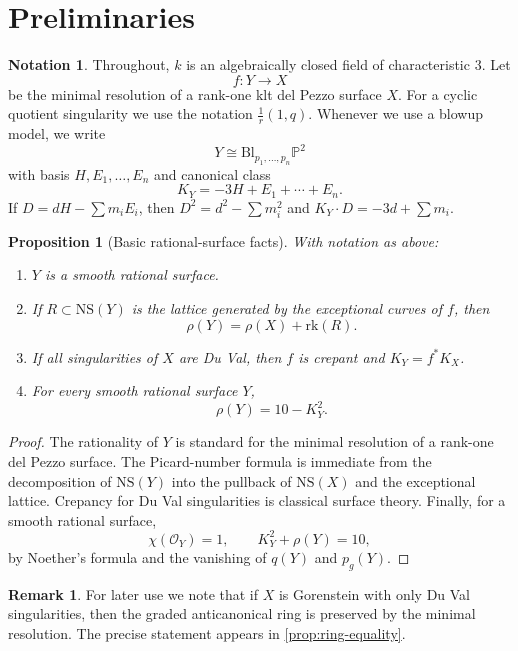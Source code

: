 \documentclass[11pt]{article}
\newtheorem{proposition}[theorem]{Proposition}
\theoremstyle{definition}
\newtheorem{remark}[theorem]{Remark}
\newtheorem{notation}[theorem]{Notation}
\newcommand{\Pbb}{\mathbb P}
\newcommand{\NS}{\mathrm{NS}}
\newcommand{\rk}{\mathrm{rk}}
\newcommand{\Bl}{\mathrm{Bl}}
\begin{document}
\section{Preliminaries}\label{sec:prelim}

\begin{notation}
Throughout, $k$ is an algebraically closed field of characteristic $3$. Let
\[
f\colon Y\to X
\]
be the minimal resolution of a rank-one klt del Pezzo surface $X$. For a cyclic quotient singularity we use the notation $\frac1r(1,q)$. Whenever we use a blowup model, we write
\[
Y\cong \Bl_{p_1,\dots,p_n}\Pbb^2
\]
with basis $H,E_1,\dots,E_n$ and canonical class
\[
K_Y=-3H+E_1+\cdots+E_n.
\]
If $D=dH-\sum m_iE_i$, then $D^2=d^2-\sum m_i^2$ and $K_Y\cdot D=-3d+\sum m_i$.
\end{notation}

\begin{proposition}[Basic rational-surface facts]\label{prop:basic}
With notation as above:
\begin{enumerate}[label=\textup{(\roman*)}]
\item $Y$ is a smooth rational surface.
\item If $R\subset \NS(Y)$ is the lattice generated by the exceptional curves of $f$, then
\[
\rho(Y)=\rho(X)+\rk(R).
\]
\item If all singularities of $X$ are Du Val, then $f$ is crepant and $K_Y=f^*K_X$.
\item For every smooth rational surface $Y$,
\[
\rho(Y)=10-K_Y^2.
\]
\end{enumerate}
\end{proposition}

\begin{proof}
The rationality of $Y$ is standard for the minimal resolution of a rank-one del Pezzo surface. The Picard-number formula is immediate from the decomposition of $\NS(Y)$ into the pullback of $\NS(X)$ and the exceptional lattice. Crepancy for Du Val singularities is classical surface theory. Finally, for a smooth rational surface,
\[
\chi(\mathcal O_Y)=1,
\qquad
K_Y^2+\rho(Y)=10,
\]
by Noether's formula and the vanishing of $q(Y)$ and $p_g(Y)$.
\end{proof}

\begin{remark}
For later use we note that if $X$ is Gorenstein with only Du Val singularities, then the graded anticanonical ring is preserved by the minimal resolution. The precise statement appears in \cref{prop:ring-equality}.
\end{remark}
\end{document}
